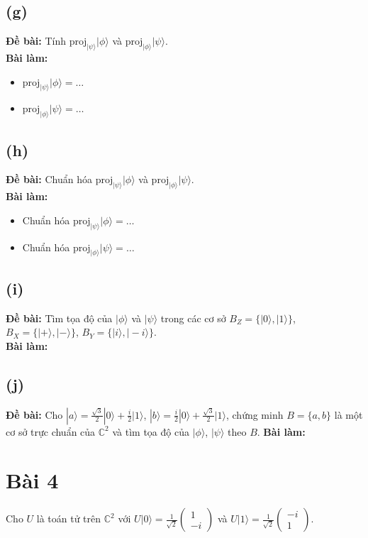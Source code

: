 \subsection{(g)}
\textbf{Đề bài:} Tính $\mathrm{proj}_{|\psi\rangle}|\phi\rangle$ và $\mathrm{proj}_{|\phi\rangle}|\psi\rangle$.\\
\textbf{Bài làm:}
\begin{itemize}
    \item $\mathrm{proj}_{|\psi\rangle}|\phi\rangle = \dots$
    \item $\mathrm{proj}_{|\phi\rangle}|\psi\rangle = \dots$
\end{itemize}

\subsection{(h)}
\textbf{Đề bài:} Chuẩn hóa $\mathrm{proj}_{|\psi\rangle}|\phi\rangle$ và $\mathrm{proj}_{|\phi\rangle}|\psi\rangle$.\\
\textbf{Bài làm:}
\begin{itemize}
    \item Chuẩn hóa $\mathrm{proj}_{|\psi\rangle}|\phi\rangle = \dots$
    \item Chuẩn hóa $\mathrm{proj}_{|\phi\rangle}|\psi\rangle = \dots$
\end{itemize}

\subsection{(i)}
\textbf{Đề bài:} Tìm tọa độ của $|\phi\rangle$ và $|\psi\rangle$ trong các cơ sở $B_{Z}=\{|0\rangle,|1\rangle\}$, $B_{X}=\{|+\rangle,|-\rangle\}$, $B_{Y}=\{|i\rangle,|-i\rangle\}$.\\
\textbf{Bài làm:}

\subsection{(j)}
\textbf{Đề bài:} Cho $|a\rangle=\frac{\sqrt{3}}{2}|0\rangle+\frac{i}{2}|1\rangle$, $|b\rangle=\frac{i}{2}|0\rangle+\frac{\sqrt{3}}{2}|1\rangle$, chứng minh $B=\{a,b\}$ là một cơ sở trực chuẩn của $\mathbb{C}^{2}$ và tìm tọa độ của $|\phi\rangle$, $|\psi\rangle$ theo $B$.
\textbf{Bài làm:}

\section{Bài 4}
Cho $U$ là toán tử trên $\mathbb{C}^{2}$ với $U|0\rangle=\frac{1}{\sqrt{2}}\begin{pmatrix}1\\ -i\end{pmatrix}$ và $U|1\rangle=\frac{1}{\sqrt{2}}\begin{pmatrix}-i\\ 1\end{pmatrix}$.

